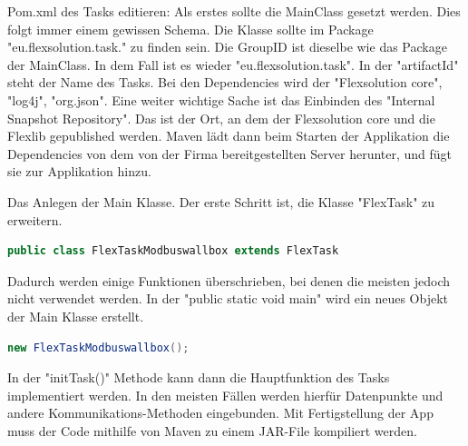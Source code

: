 \begin{compactenum}
    
    \item Pom.xml des Tasks editieren: Als erstes sollte die MainClass gesetzt werden. Dies folgt immer einem gewissen Schema. Die Klasse sollte im Package "eu.flexsolution.task." zu finden sein. Die GroupID ist dieselbe wie das Package der MainClass. In dem Fall ist es wieder "eu.flexsolution.task".  In der "artifactId" steht der Name des Tasks. Bei den Dependencies wird der "Flexsolution core", "log4j", "org.json". Eine weiter wichtige Sache ist das Einbinden des "Internal Snapshot Repository". Das ist der Ort, an dem der Flexsolution core und die Flexlib gepublished werden. Maven lädt dann beim Starten der Applikation die Dependencies von dem von der Firma bereitgestellten Server herunter, und fügt sie zur Applikation hinzu.   
    \item Das Anlegen der Main Klasse. Der erste Schritt ist, die Klasse "FlexTask" zu erweitern.  
    \begin{lstlisting}[language=java,caption=Example Element,label=lst:impl:foo]
        public class FlexTaskModbuswallbox extends FlexTask 
    \end{lstlisting}
    Dadurch werden einige Funktionen überschrieben, bei denen die meisten jedoch nicht verwendet werden. In der "public static void main" wird ein neues Objekt der Main Klasse erstellt.   
    \begin{lstlisting}[language=java,caption=Example Element,label=lst:impl:foo]
        new FlexTaskModbuswallbox();  
    \end{lstlisting}
    In der "initTask(){}" Methode kann dann die Hauptfunktion des Tasks implementiert werden. In den meisten Fällen werden hierfür Datenpunkte und andere Kommunikations-Methoden eingebunden. Mit Fertigstellung der App muss der Code mithilfe von Maven zu einem JAR-File kompiliert werden. 
    

\end{compactenum}

